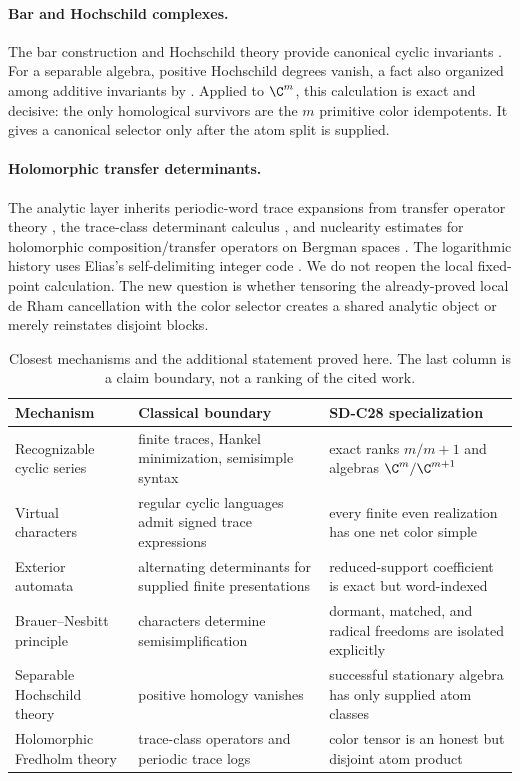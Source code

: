 \paragraph{Bar and Hochschild complexes.}
The bar construction and Hochschild theory provide canonical cyclic
invariants \citep{hochschild1945cohomology,loday1998cyclic}.  For a separable
algebra, positive Hochschild degrees vanish, a fact also organized among
additive invariants by \citet{tabuada2016separable}.  Applied to \(\C^m\), this
calculation is exact and decisive: the only homological survivors are the
\(m\) primitive color idempotents.  It gives a canonical selector only after
the atom split is supplied.

\paragraph{Holomorphic transfer determinants.}
The analytic layer inherits periodic-word trace expansions from transfer
operator theory \citep{ruelle1976zeta}, the trace-class determinant calculus
\citep{simon1977determinants}, and nuclearity estimates for holomorphic
composition/transfer operators on Bergman spaces
\citep{bandtlow2008eigenvalue}.  The logarithmic history uses Elias's
self-delimiting integer code \citep{elias1975universal}.  We do not reopen the
local fixed-point calculation.  The new question is whether tensoring the
already-proved local de Rham cancellation with the color selector creates a
shared analytic object or merely reinstates disjoint blocks.

\begin{table}[t]
\centering
\small
\caption{Closest mechanisms and the additional statement proved here.  The
last column is a claim boundary, not a ranking of the cited work.}
\label{tab:literature-boundary}
\begin{tabularx}{\textwidth}{L{31mm} L{48mm} Y}
\toprule
Mechanism & Classical boundary & SD-C28 specialization \\
\midrule
Recognizable cyclic series & finite traces, Hankel minimization, semisimple
syntax & exact ranks \(m/m+1\) and algebras \(\C^m/\C^{m+1}\) \\
Virtual characters & regular cyclic languages admit signed trace expressions
& every finite even realization has one net color simple \\
Exterior automata & alternating determinants for supplied finite
presentations & reduced-support coefficient is exact but word-indexed \\
Brauer--Nesbitt principle & characters determine semisimplification & dormant,
matched, and radical freedoms are isolated explicitly \\
Separable Hochschild theory & positive homology vanishes & successful
stationary algebra has only supplied atom classes \\
Holomorphic Fredholm theory & trace-class operators and periodic trace logs &
color tensor is an honest but disjoint atom product \\
\bottomrule
\end{tabularx}
\end{table}

